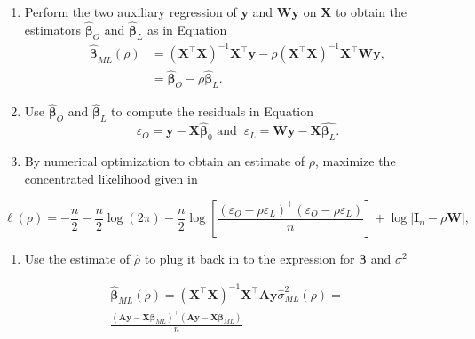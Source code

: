 \documentclass[
  letterpaper,
  DIV=11,
  numbers=noendperiod]{scrreprt}
\providecommand{\tightlist}{%
  \setlength{\itemsep}{0pt}\setlength{\parskip}{0pt}}\usepackage{longtable,booktabs,array}
\begin{document}
\begin{enumerate}
\def\labelenumi{\arabic{enumi})}
\item
  Perform the two auxiliary regression of \(\boldsymbol{\mathbf{y}}\)
  and \(\boldsymbol{\mathbf{W}}\boldsymbol{\mathbf{y}}\) on
  \(\boldsymbol{\mathbf{X}}\) to obtain the estimators
  \(\widehat{\boldsymbol{\mathbf{\beta}}}_O\) and
  \(\widehat{\boldsymbol{\mathbf{\beta}}}_L\) as in Equation \[
  \begin{split}
  \widehat{\boldsymbol{\mathbf{\beta}}}_{ML}(\rho) &= \left(\boldsymbol{\mathbf{X}}^\top\boldsymbol{\mathbf{X}}\right)^{-1}\boldsymbol{\mathbf{X}}^\top\boldsymbol{\mathbf{y}} - \rho\left(\boldsymbol{\mathbf{X}}^\top\boldsymbol{\mathbf{X}}\right)^{-1}\boldsymbol{\mathbf{X}}^\top\boldsymbol{\mathbf{W}}\boldsymbol{\mathbf{y}}, \\
  &= \widehat{\boldsymbol{\mathbf{\beta}}}_O -\rho \widehat{\boldsymbol{\mathbf{\beta}}}_L.
  \end{split}
  \]
\item
  Use \(\widehat{\boldsymbol{\mathbf{\beta}}}_O\) and
  \(\widehat{\boldsymbol{\mathbf{\beta}}}_L\) to compute the residuals
  in Equation \[
  \varepsilon_O = \boldsymbol{\mathbf{y}} - \boldsymbol{\mathbf{X}}\widehat{\boldsymbol{\mathbf{\beta}}}_0\,\,\mbox{and} \;\; \varepsilon_L = \boldsymbol{\mathbf{W}}\boldsymbol{\mathbf{y}} - \boldsymbol{\mathbf{X}}\widehat{\boldsymbol{\mathbf{\beta}}_L}.
  \]
\item
  By numerical optimization to obtain an estimate of \(\rho\), maximize
  the concentrated likelihood given in
\end{enumerate}

\[
\ell(\rho)=-\frac{n}{2}-\frac{n}{2}\log(2\pi) - \frac{n}{2}\log\left[\frac{\left(\varepsilon_O - \rho\varepsilon_L\right)^\top\left(\varepsilon_O - \rho\varepsilon_L\right)}{n}\right] + \log\left|\boldsymbol{\mathbf{I}}_n - \rho\boldsymbol{\mathbf{W}}\right|,
\]

\begin{enumerate}
\def\labelenumi{\arabic{enumi})}
\setcounter{enumi}{3}
\tightlist
\item
  Use the estimate of \(\widehat{\rho}\) to plug it back in to the
  expression for \(\boldsymbol{\mathbf{\beta}}\) and \(\sigma^2\)
\end{enumerate}

\[
\begin{split}
\widehat{\boldsymbol{\mathbf{\beta}}}_{ML}(\rho) = \left(\boldsymbol{\mathbf{X}}^\top\boldsymbol{\mathbf{X}}\right)^{-1}\boldsymbol{\mathbf{X}}^\top\boldsymbol{\mathbf{A}}\boldsymbol{\mathbf{y}}
\widehat{\sigma}^2_{ML}(\rho) =\\ 
\frac{\left(\boldsymbol{\mathbf{A}}\boldsymbol{\mathbf{y}} - \boldsymbol{\mathbf{X}}\boldsymbol{\mathbf{\beta}}_{ML}\right)^\top\left(\boldsymbol{\mathbf{A}}\boldsymbol{\mathbf{y}} - \boldsymbol{\mathbf{X}}\boldsymbol{\mathbf{\beta}}_{ML}\right)}{n}
\end{split}
\]
\end{document}
